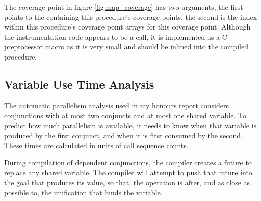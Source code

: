 The coverage point in figure \ref{fig:map_coverage}
has two arguments,
the first points to the \PS containing this procedure's coverage points,
the second is the index within this procedure's coverage point arrays
for this coverage point.
Although the instrumentation code appears to be a call,
it is implemented as a C preprocessor macro as it is very small and should
be inlined into the compiled procedure.


\subsection{Variable Use Time Analysis}
\label{sec:backgnd_var_use_analysis}

The automatic parallelism analysis used in my honours report considers
conjunctions with at most two conjuncts and at most one shared variable.
To predict how much parallelism is available,
it needs to know when that variable is produced by the first conjunct,
and when it is first consumed by the second.
These times are calculated in units of call sequence counts.

During compilation of dependent conjunctions,
the compiler creates a future to replace any shared variable.
The compiler will attempt to push that future into the goal that
produces its value,
so that,
the \signal operation is after, and as close as possible
to, the unification that binds the variable.

